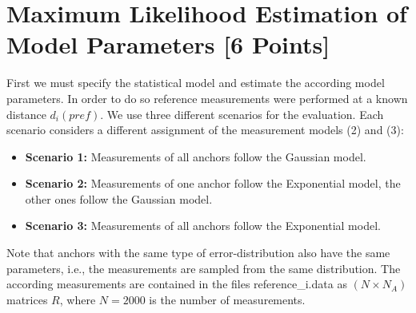 \documentclass[a4paper]{article}
\begin{document}
\newpage

\section{Maximum Likelihood Estimation of Model Parameters [6 Points]}

First we must specify the statistical model and estimate the according model parameters. In order to do so reference measurements were performed at a known distance $d_i(pref)$.
We use three different scenarios for the evaluation. Each scenario considers a different assignment of the measurement models (2) and (3):

\begin{itemize}[label={}]
  \item \textbf{Scenario 1:} Measurements of all anchors follow the Gaussian model.
  \item \textbf{Scenario 2:} Measurements of one anchor follow the Exponential model, the other ones follow the Gaussian model.
  \item \textbf{Scenario 3:} Measurements of all anchors follow the Exponential model.
\end{itemize}

\noindent
Note that anchors with the same type of error-distribution also have the same parameters, i.e., the measurements are sampled from the same distribution.
The according measurements are contained in the files reference\_i.data as $(N × N_A)$ matrices $R$, where $N = 2000$ is the number of measurements.
\end{document}
